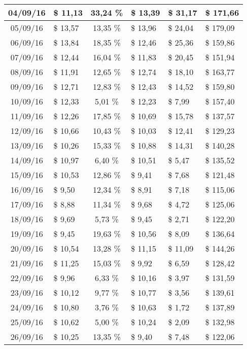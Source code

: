 \begin{center}
\begin{small}
\begin{longtable}{|c|l|c|l|l|l|}
04/09/16 & \$ 11,13 & 33,24 \% & \$ 13,39 & \$ 31,17 & \$ 171,66 \\ \hline
05/09/16 & \$ 13,57 & 13,35 \% & \$ 13,96 & \$ 24,04 & \$ 179,09 \\ \hline
06/09/16 & \$ 13,84 & 18,35 \% & \$ 12,46 & \$ 25,36 & \$ 159,86 \\ \hline
07/09/16 & \$ 12,44 & 16,04 \% & \$ 11,83 & \$ 20,45 & \$ 151,94 \\ \hline
08/09/16 & \$ 11,91 & 12,65 \% & \$ 12,74 & \$ 18,10 & \$ 163,77 \\ \hline
09/09/16 & \$ 12,71 & 12,83 \% & \$ 12,43 & \$ 14,52 & \$ 159,80 \\ \hline
10/09/16 & \$ 12,33 & 5,01 \% & \$ 12,23 & \$ 7,99 & \$ 157,40 \\ \hline
11/09/16 & \$ 12,26 & 17,85 \% & \$ 10,69 & \$ 15,78 & \$ 137,57 \\ \hline
12/09/16 & \$ 10,66 & 10,43 \% & \$ 10,03 & \$ 12,41 & \$ 129,23 \\ \hline
13/09/16 & \$ 10,26 & 15,33 \% & \$ 10,88 & \$ 14,31 & \$ 140,28 \\ \hline
14/09/16 & \$ 10,97 & 6,40 \% & \$ 10,51 & \$ 5,47 & \$ 135,52 \\ \hline
15/09/16 & \$ 10,53 & 12,86 \% & \$ 9,41 & \$ 7,68 & \$ 121,48 \\ \hline
16/09/16 & \$ 9,50 & 12,34 \% & \$ 8,91 & \$ 7,18 & \$ 115,06 \\ \hline
17/09/16 & \$ 8,88 & 11,34 \% & \$ 9,68 & \$ 4,72 & \$ 125,06 \\ \hline
18/09/16 & \$ 9,69 & 5,73 \% & \$ 9,45 & \$ 2,71 & \$ 122,20 \\ \hline
19/09/16 & \$ 9,45 & 19,63 \% & \$ 10,56 & \$ 8,09 & \$ 136,64 \\ \hline
20/09/16 & \$ 10,54 & 13,28 \% & \$ 11,15 & \$ 11,09 & \$ 144,26 \\ \hline
21/09/16 & \$ 11,25 & 15,03 \% & \$ 9,92 & \$ 6,59 & \$ 128,42 \\ \hline
22/09/16 & \$ 9,96 & 6,33 \% & \$ 10,16 & \$ 3,97 & \$ 131,59 \\ \hline
23/09/16 & \$ 10,12 & 9,77 \% & \$ 10,77 & \$ 3,56 & \$ 139,61 \\ \hline
24/09/16 & \$ 10,80 & 3,76 \% & \$ 10,63 & \$ 1,72 & \$ 137,89 \\ \hline
25/09/16 & \$ 10,62 & 5,00 \% & \$ 10,24 & \$ 2,09 & \$ 132,98 \\ \hline
26/09/16 & \$ 10,25 & 13,35 \% & \$ 9,40 & \$ 7,48 & \$ 122,06 \\ \hline

\end{longtable}
\end{small}
\end{center}
